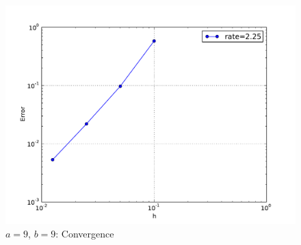 \documentclass[10pt,letterpaper]{article}
\begin{document}
\begin{figure}[p]
\begin{center}
\includegraphics[width=5in,keepaspectratio]{be99.pdf}
\end{center}
\caption{$a=9$, $b=9$: Convergence}
\end{figure}

\clearpage
\newpage

\end{document}
